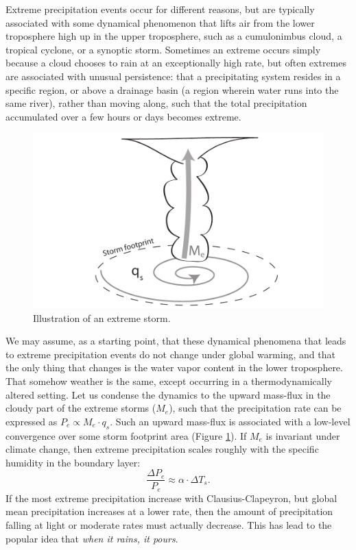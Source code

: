 \documentclass[12pt]{book}
\begin{document}
Extreme precipitation events occur for different reasons, but are typically associated with some dynamical phenomenon that lifts air from the lower troposphere high up in the upper troposphere, such as a cumulonimbus cloud, a tropical cyclone, or a synoptic storm. Sometimes an extreme occurs simply because a cloud chooses to rain at an exceptionally high rate, but often extremes are associated with unusual persistence: that a precipitating system resides in a specific region, or above a drainage basin (a region wherein water runs into the same river), rather than moving along, such that the total precipitation accumulated over a few hours or days becomes extreme. 
\begin{figure}
\begin{center}
\includegraphics[height=6 cm]{../Illustrations/Extreme_storm_dynamics.pdf}
\end{center}
\caption{ Illustration of an extreme storm. } 
\label{fig:extreme_storm_dynamics}
\end{figure}

We may assume, as a starting point, that these dynamical phenomena that leads to extreme precipitation events do not change under global warming, and that the only thing that changes is the water vapor content in the lower troposphere. That somehow weather is the same, except occurring in a thermodynamically altered setting. Let us condense the dynamics to the upward mass-flux in the cloudy part of the extreme storms ($M_e$), such that the precipitation rate can be expressed as $P_e \propto M_e \cdot q_s$. Such an upward mass-flux is associated with a low-level convergence over some storm footprint area (Figure \ref{fig:extreme_storm_dynamics}). If $M_e$ is invariant under climate change, then extreme precipitation scales roughly with the specific humidity in the boundary layer:
$$ \frac{\Delta P_e}{P_e} \approx \alpha \cdot \Delta T_s.  $$
If the most extreme precipitation increase with Clausius-Clapeyron, but global mean precipitation increases at a lower rate, then the amount of precipitation falling at light or moderate rates must actually decrease. This has lead to the popular idea that {\em when it rains, it pours}.
\end{document}
